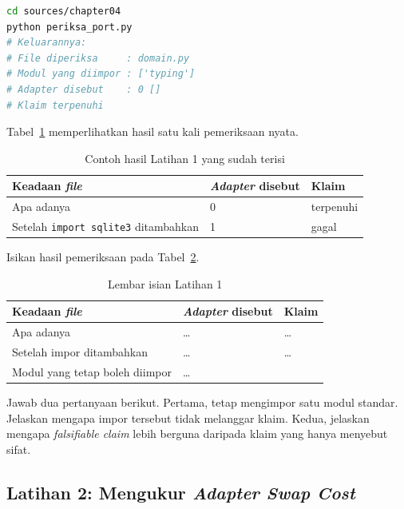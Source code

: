 \begin{lstlisting}[language=bash, caption={Menjalankan pemeriksaan kemandirian,
  skrip tersedia di \berkas{sources/chapter04/periksa_port.py}},
  label=lst:jalankan-periksa-port]
cd sources/chapter04
python periksa_port.py
# Keluarannya:
# File diperiksa     : domain.py
# Modul yang diimpor : ['typing']
# Adapter disebut    : 0 []
# Klaim terpenuhi
\end{lstlisting}

Tabel~\ref{tab:lat1port-contoh} memperlihatkan hasil satu kali pemeriksaan
nyata.

\begin{table}[htbp]
  \centering
  \caption{Contoh hasil Latihan 1 yang sudah terisi}
  \label{tab:lat1port-contoh}
  \begin{tabularx}{\textwidth}{|X|l|l|}
    \hline
    \textbf{Keadaan \textit{file}} & \textbf{\textit{Adapter} disebut} & \textbf{Klaim} \\
    \hline
    Apa adanya & 0 & terpenuhi \\
    \hline
    Setelah \texttt{import sqlite3} ditambahkan & 1 & gagal \\
    \hline
  \end{tabularx}
\end{table}

Isikan hasil pemeriksaan pada Tabel~\ref{tab:lat1port-hasil}.

\begin{table}[htbp]
  \centering
  \caption{Lembar isian Latihan 1}
  \label{tab:lat1port-hasil}
  \begin{tabularx}{\textwidth}{|X|l|l|}
    \hline
    \textbf{Keadaan \textit{file}} & \textbf{\textit{Adapter} disebut} & \textbf{Klaim} \\
    \hline
    Apa adanya & \dots & \dots \\
    \hline
    Setelah impor ditambahkan & \dots & \dots \\
    \hline
    Modul yang tetap boleh diimpor & \multicolumn{2}{l|}{\dots} \\
    \hline
  \end{tabularx}
\end{table}

Jawab dua pertanyaan berikut. Pertama,  tetap mengimpor satu
modul standar. Jelaskan mengapa impor tersebut tidak melanggar klaim. Kedua,
jelaskan mengapa \textit{falsifiable claim} lebih berguna daripada klaim yang
hanya menyebut sifat.

\subsection*{Latihan 2: Mengukur \textit{Adapter Swap Cost}}

